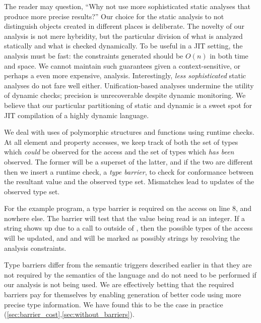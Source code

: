 The reader may question, ``Why not use more sophisticated static analyses that
produce more precise results?''
Our choice for the static analysis to not distinguish  objects
created in different places is deliberate. The novelty of our analysis is not
mere hybridity, but the particular division of what is analyzed statically and
what is checked dynamically. To be useful in a JIT setting, the analysis must
be fast: the constraints generated should be $O(n)$ in both time and space. We
cannot maintain such guarantees given a context-sensitive, or perhaps a even
more expensive, analysis. Interestingly, \emph{less sophisticated} static
analyses do not fare well either. Unification-based analyses undermine the
utility of dynamic checks; precision is unrecoverable despite dynamic
monitoring. We believe that our particular partitioning of static and dynamic
is a sweet spot for JIT compilation of a highly dynamic language.

We deal with uses of polymorphic structures and functions using runtime checks.
At all element and property accesses, we keep track of both the set of
types which \emph{could} be observed for the access and the set of types
which \emph{has been} observed.
The former will be a superset of the latter, and if the two are different then
we insert a runtime check, a {\it type barrier}, to check for conformance
between the resultant value and the observed type set.
Mismatches lead to updates of the observed type set.

For the example program, a type barrier is required on the  access
on line 8, and nowhere else. The barrier will test that the value being read
is an integer. If a string shows up due to a call to 
outside of , then the possible types of the  access
will be updated, and  and  will be marked as possibly
strings by resolving the analysis constraints.

Type barriers differ from the semantic triggers described earlier in that
they are not required by the semantics of the language and do not need to
be performed if our analysis is not being used.
We are effectively betting that the required barriers
pay for themselves by enabling generation of better code using more precise type information.
We have found this to be the case in practice (\Section\ref{sec:barrier_cost},\Section\ref{sec:without_barriers}).


